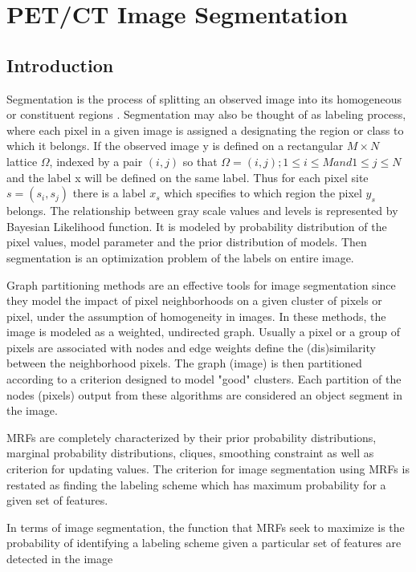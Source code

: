 \section{PET/CT Image Segmentation}

\subsection{Introduction}
Segmentation is the process of splitting an observed image into its homogeneous or constituent regions . Segmentation may also be thought of as labeling process, where each pixel in a given image is assigned a designating the region or class to which it belongs. If the observed image y is defined on a rectangular $M \times N$ lattice $\Omega$, indexed  by a pair $(i,j)$ so that \(\Omega={(i,j);1\leq i\leq M and 1 \leq j \leq N}\) and the label x will be defined on the same label. Thus for each pixel site $s=(s_i,s_j)$ there is a label $x_s$ which specifies to which region the pixel $y_s$ belongs. The relationship between  gray scale values and levels is represented by Bayesian Likelihood function.  It is modeled by probability distribution of the pixel values, model parameter and the prior distribution of models. Then segmentation is an optimization problem  of the labels on entire image\cite{barker1998image}.

Graph partitioning methods are an effective tools for image segmentation since they model the impact of pixel neighborhoods on a given cluster of pixels or pixel, under the assumption of homogeneity in images. In these methods, the image is modeled as a weighted, undirected graph. Usually a pixel or a group of pixels are associated with nodes and edge weights define the (dis)similarity between the neighborhood pixels. The graph (image) is then partitioned according to a criterion designed to model "good" clusters. Each partition of the nodes (pixels) output from these algorithms are considered an object segment in the image.\par
MRFs are completely characterized by their prior probability distributions, marginal probability distributions, cliques, smoothing constraint as well as criterion for updating values. The criterion for image segmentation using MRFs is restated as finding the labeling scheme which has maximum probability for a given set of features. \par

In terms of image segmentation, the function that MRFs seek to maximize is the probability of identifying a labeling scheme given a particular set of features are detected in the image




